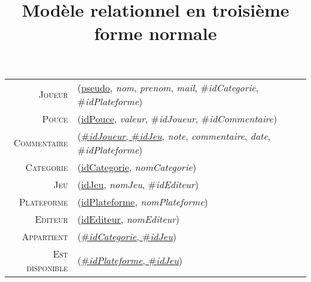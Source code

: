 \documentclass{article}
\title{Modèle relationnel en troisième forme normale}
\newenvironment{mld}
{\par\begin{minipage}{\linewidth}\begin{tabular}{rp{\linewidth}}}
{\end{tabular}\end{minipage}\par}
\newcommand{\relat}[1]{\textsc{#1}}
\newcommand{\attr}[1]{\emph{#1}}
\newcommand{\prim}[1]{\uline{#1}}
\newcommand{\foreign}[1]{\#\textsl{#1}}
\begin{document}
\maketitle{}

\begin{mld}
  \relat{Joueur} & (\prim{pseudo}, \attr{nom}, \attr{prenom}, \attr{mail}, \foreign{idCategorie}, \foreign{idPlateforme})\\
  \relat{Pouce} & (\prim{idPouce}, \attr{valeur}, \foreign{idJoueur}, \foreign{idCommentaire})\\
  \relat{Commentaire} & (\prim{\foreign{idJoueur}, \foreign{idJeu}}, \attr{note}, \attr{commentaire}, \attr{date}, \foreign{idPlateforme})\\
  \relat{Categorie} & (\prim{idCategorie}, \attr{nomCategorie})\\
  \relat{Jeu} & (\prim{idJeu}, \attr{nomJeu}, \foreign{idEditeur})\\
  \relat{Plateforme} & (\prim{idPlateforme}, \attr{nomPlateforme})\\
  \relat{Editeur} & (\prim{idEditeur}, \attr{nomEditeur})\\
  \relat{Appartient} & (\prim{\foreign{idCategorie}, \foreign{idJeu}})\\
  \relat{Est disponible} & (\prim{\foreign{idPlateforme}, \foreign{idJeu}})\\
\end{mld}
\end{document}

